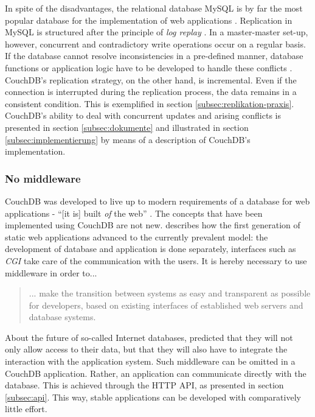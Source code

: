 In spite of the disadvantages, the relational database MySQL \cite{mysql:website} is by far the most popular database for the implementation of web applications \cite[p. 18]{os:barometer}. Replication in MySQL is structured after the principle of \textit{log replay} \cite{mysql:replication}. In a master-master set-up, however, concurrent and contradictory write operations occur on a regular basis. If the database cannot resolve inconsistencies in a pre-defined manner, database functions or application logic have to be developed to handle these conflicts \cite{mysql:multimaster}. CouchDB's replication strategy, on the other hand, is incremental. Even if the connection is interrupted during the replication process, the data remains in a consistent condition. This is exemplified in section \ref{subsec:replikation-praxis}. CouchDB's ability to deal with concurrent updates and arising conflicts is presented in section \ref{subsec:dokumente} and illustrated in section \ref{subsec:implementierung} by means of a description of CouchDB's implementation.



\subsubsection{No middleware}

CouchDB was developed to live up to modern requirements of a database for web applications - \enquote{[it is] built \textit{of} the web} \cite{couch:oftheweb}. The concepts that have been implemented using CouchDB are not new.  describes how the first generation of static web applications advanced to the currently prevalent model: the development of database and application is done separately, interfaces such as \textit{CGI} \cite{w3c:cgi} take care of the communication with the users. It is hereby necessary to use middleware in order to...

\begin{quote}
... make the transition between systems as easy and transparent as possible for developers, based on existing interfaces of established web servers and database systems. 
\end{quote}

About the future of so-called Internet databases,  predicted that they will not only allow access to their data, but that they will also have to integrate the interaction with the application system. Such middleware can be omitted in a CouchDB application. Rather, an application can communicate directly with the database. This is achieved through the HTTP API, as presented in section \ref{subsec:api}. This way, stable applications can be developed with comparatively little effort.

